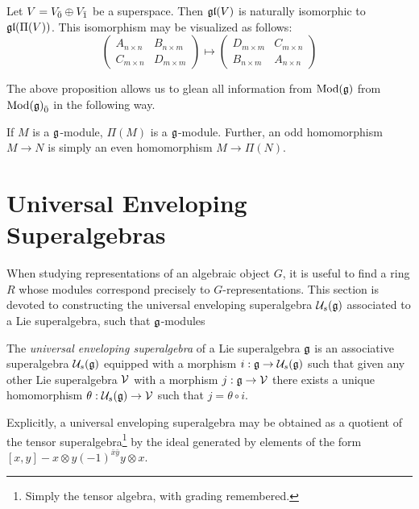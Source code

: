 \begin{proposition}
  Let $V = {V}_{\bar{0}} \oplus {V}_{\bar{1}}$ be a superspace. Then $\mathfrak{gl}(V)$ is naturally isomorphic to $\mathfrak{gl}(\Pi(V))$. This isomorphism may be visualized as follows:
\begin{equation}
    \left(
      \begin{array}{c|c}
        A_{n \times n} & B_{n \times m} \\
        \hline
        C_{m \times n} & D_{m \times m}
      \end{array}
    \right)
    \mapsto
    \left(
      \begin{array}{c|c}
        D_{m \times m} & C_{m \times n} \\
        \hline
        B_{n \times m} & A_{n \times n}
      \end{array}
    \right)
\end{equation}
  
  \end{proposition}

The above proposition allows us to glean all information from $\operatorname{Mod}(\mathfrak{g})$ from ${\operatorname{Mod}(\mathfrak{g})}_{\bar{0}}$ in the following way.
\begin{corollary}
  If $M$ is a $\mathfrak{g}$-module, $\Pi(M)$ is a $\mathfrak{g}$-module. Further, an odd homomorphism $M \to N$ is simply an even homomorphism $M \to \Pi(N)$.
\end{corollary}


\section{Universal Enveloping Superalgebras}
\label{sec:universal-enveloping-superalgebras}

When studying representations of an algebraic object $G$, it is useful to find a ring $R$ whose modules correspond precisely to $G$-representations. This section is devoted to constructing the universal enveloping superalgebra $\mathcal{U}_s(\mathfrak{g})$ associated to a Lie superalgebra, such that $\mathfrak{g}$-modules 
\begin{definition}
  The \emph{universal enveloping superalgebra} of a Lie superalgebra $\mathfrak{g}$ is an associative superalgebra $\mathcal{U}_s(\mathfrak{g})$ equipped with a morphism $i: \mathfrak{g} \to \mathcal{U}_s(\mathfrak{g})$ such that given any other Lie superalgebra $\mathcal{V}$ with a morphism $j: \mathfrak{g} \to \mathcal{V}$ there exists a unique homomorphism $\theta: \mathcal{U}_s(\mathfrak{g}) \to \mathcal{V}$ such that $j = \theta \circ i$.

  Explicitly, a universal enveloping superalgebra may be obtained as a quotient of the tensor superalgebra\footnote{Simply the tensor algebra, with grading remembered.} by the ideal generated by elements of the form $[x,y] - x \otimes y (-1)^{\bar x \bar y} y \otimes x$.
\end{definition}

